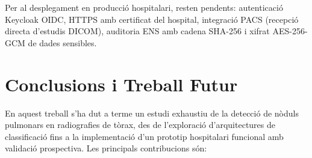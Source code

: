 Per al desplegament en producció hospitalari, resten pendents: autenticació Keycloak OIDC, HTTPS amb certificat del hospital, integració PACS (recepció directa d'estudis DICOM), auditoria ENS amb cadena SHA-256 i xifrat AES-256-GCM de dades sensibles.

\section{Conclusions i Treball Futur}

En aquest treball s'ha dut a terme un estudi exhaustiu de la detecció de nòduls pulmonars en radiografies de tòrax, des de l'exploració d'arquitectures de classificació fins a la implementació d'un prototip hospitalari funcional amb validació prospectiva. Les principals contribucions són:

